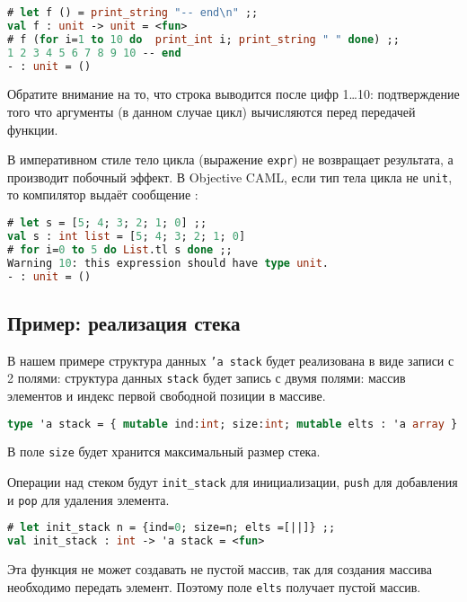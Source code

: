 \begin{lstlisting}[language=OCaml]
# let f () = print_string "-- end\n" ;;
val f : unit -> unit = <fun>
# f (for i=1 to 10 do  print_int i; print_string " " done) ;;
1 2 3 4 5 6 7 8 9 10 -- end
- : unit = ()
\end{lstlisting}

Обратите внимание на то, что строка  выводится после цифр 1…10:
подтверждение того что аргументы (в данном случае цикл) вычисляются перед
передачей функции.

В императивном стиле тело цикла (выражение \texttt{expr}) не возвращает
результата, а производит побочный эффект. В Objective CAML, если тип тела цикла
не \texttt{unit}, то компилятор выдаёт сообщение :

\begin{lstlisting}[language=OCaml]
# let s = [5; 4; 3; 2; 1; 0] ;;
val s : int list = [5; 4; 3; 2; 1; 0]
# for i=0 to 5 do List.tl s done ;;
Warning 10: this expression should have type unit.
- : unit = ()
\end{lstlisting}

\subsection{Пример: реализация стека}
\label{subsec:example_implementing_a_stack}

В нашем примере структура данных \texttt{'a stack} будет реализована в виде
записи с 2 полями: структура данных \texttt{stack} будет запись с двумя полями:
массив элементов и индекс первой свободной позиции в массиве.

\begin{lstlisting}[language=OCaml]
type 'a stack = { mutable ind:int; size:int; mutable elts : 'a array } ;;
\end{lstlisting}

В поле \texttt{size} будет хранится максимальный размер стека.

Операции над стеком будут \texttt{init\_stack} для инициализации, \texttt{push}
для добавления и \texttt{pop} для удаления элемента.

\begin{lstlisting}[language=OCaml]
# let init_stack n = {ind=0; size=n; elts =[||]} ;;
val init_stack : int -> 'a stack = <fun>
\end{lstlisting}

Эта функция не может создавать не пустой массив, так для создания массива
необходимо передать элемент. Поэтому поле \texttt{elts} получает пустой массив.

